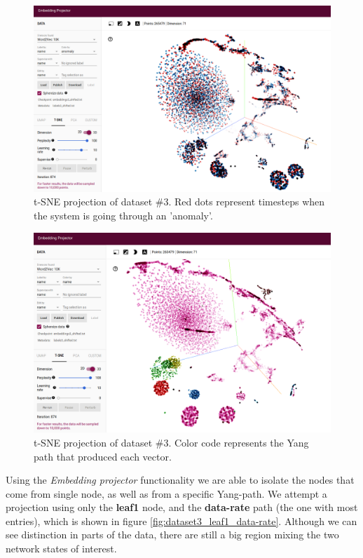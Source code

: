 \begin{figure}[h!]
	\centering
	\includegraphics[width=0.8\linewidth]{Figure/dataset3_all_P100.png}
	\caption{t-SNE projection of dataset \#3. Red dots represent timesteps when the system is going through an 'anomaly'.}
	\label{fig:dataset3_all_P100}
\end{figure}
\begin{figure}[h!]
	\centering
	\includegraphics[width=0.8\linewidth]{Figure/dataset3_all_P100_name.png}
	\caption{t-SNE projection of dataset \#3. Color code represents the Yang path that produced each vector.}
	\label{fig:dataset3_all_P100_names}
\end{figure}

Using the \textit{Embedding projector} functionality we are able to isolate the nodes that come from single node, as well as from a specific Yang-path.
We attempt a projection using only the \textbf{leaf1} node, and the \textbf{data-rate} path (the one with most entries), which is shown in figure \ref{fig:dataset3_leaf1_data-rate}.
Although we can see distinction in parts of the data, there are still a big region mixing the two network states of interest.

